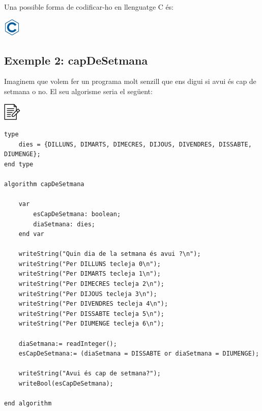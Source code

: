 \documentclass[]{book}
\newenvironment{Shaded}{\begin{snugshade}}{\end{snugshade}}
\newcommand{\DataTypeTok}[1]{\textcolor[rgb]{0.13,0.29,0.53}{#1}}
\newcommand{\DecValTok}[1]{\textcolor[rgb]{0.00,0.00,0.81}{#1}}
\newcommand{\SpecialCharTok}[1]{\textcolor[rgb]{0.00,0.00,0.00}{#1}}
\newcommand{\StringTok}[1]{\textcolor[rgb]{0.31,0.60,0.02}{#1}}
\newcommand{\ImportTok}[1]{#1}
\newcommand{\ControlFlowTok}[1]{\textcolor[rgb]{0.13,0.29,0.53}{\textbf{#1}}}
\newcommand{\PreprocessorTok}[1]{\textcolor[rgb]{0.56,0.35,0.01}{\textit{#1}}}
\newcommand{\NormalTok}[1]{#1}
\begin{document}
Una possible forma de codificar-ho en llenguatge C és:

\includegraphics{./img/c.png}

\begin{Shaded}
\end{Shaded}

\subsection{Exemple 2: capDeSetmana}\label{exemple-2-capdesetmana}

Imaginem que volem fer un programa molt senzill que ens digui si avui és
cap de setmana o no. El seu algorisme seria el següent:

\includegraphics{./img/alg.png}

\begin{verbatim}
type
    dies = {DILLUNS, DIMARTS, DIMECRES, DIJOUS, DIVENDRES, DISSABTE, DIUMENGE};
end type

algorithm capDeSetmana

    var
        esCapDeSetmana: boolean;
        diaSetmana: dies;
    end var

    writeString("Quin dia de la setmana és avui ?\n");
    writeString("Per DILLUNS tecleja 0\n");
    writeString("Per DIMARTS tecleja 1\n");
    writeString("Per DIMECRES tecleja 2\n");
    writeString("Per DIJOUS tecleja 3\n");
    writeString("Per DIVENDRES tecleja 4\n");
    writeString("Per DISSABTE tecleja 5\n");
    writeString("Per DIUMENGE tecleja 6\n");
 
    diaSetmana:= readInteger();
    esCapDeSetmana:= (diaSetmana = DISSABTE or diaSetmana = DIUMENGE);

    writeString("Avui és cap de setmana?");
    writeBool(esCapDeSetmana);

end algorithm
\end{verbatim}
\end{document}
